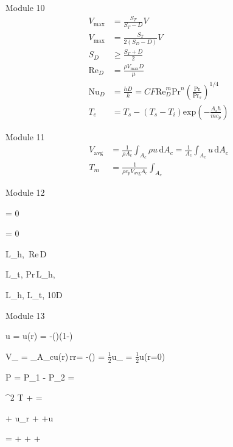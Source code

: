 \documentclass[24pt]{article}
\begin{document}
Module 10
\begin{align}
V_\mathrm{max} &= \frac{S_T}{S_T-D}V \\
V_\mathrm{max} &= \frac{S_T}{2(S_D-D)}V \\
S_D &\geq \frac{S_T+D}{2} \\
\mbox{Re}_D &= \frac{\rho V_\mathrm{max}D}{\mu} \\
\mbox{Nu}_D &= \frac{hD}{k} = CF\mbox{Re}_D^m\mbox{Pr}^n\left(\frac{\mbox{Pr}}{\mbox{Pr}_s}\right)^{1/4} \\
T_e &= T_s - (T_s-T_i)\mathrm{exp}\left(-\frac{A_s h}{\dot{m}c_p}\right)
\end{align}

Module 11
\begin{align}
V_\mathrm{avg} &= \frac{1}{\rho A_c}\int_{A_c}\!\!\rho u\,\mathrm{d}A_c = \frac{1}{A_c}\int_{A_c}\!\!u\,\mathrm{d}A_c \\
T_m &= \frac{1}{\rho c_p V_\mathrm{avg} A_c}\int_{A_c}\!\
\end{align}


Module 12

\left[u(r,x)\right] = 0

 = 0

L_{h,} \,\mbox{Re}\,D

L_{t,} \simeq \mbox{Pr}\,L_{h,}

L_{h,} \simeq L_{t,} \simeq 10D


Module 13

u = u(r) =
-\left(\right)\left(1-\right)

V_ =
\int_{A_c}\!\!u(r)\,rr\theta =
-\left(\right) =
\mbox{$\frac{1}{2}$}u_ = \mbox{$\frac{1}{2}$}u(r=0)

\Delta P = P_1 - P_2 = 

\nabla^2 T + =

 + u_r +
\frac{u_\theta}{r}\frac{\partial T}{\partial \theta}+u\frac{\partial
T}{\partial x}

 =  +
\frac{\partial T}{\partial r}\frac{\mathrm{d}r}{\mathrm{d}t} +
 + 
\end{document}
